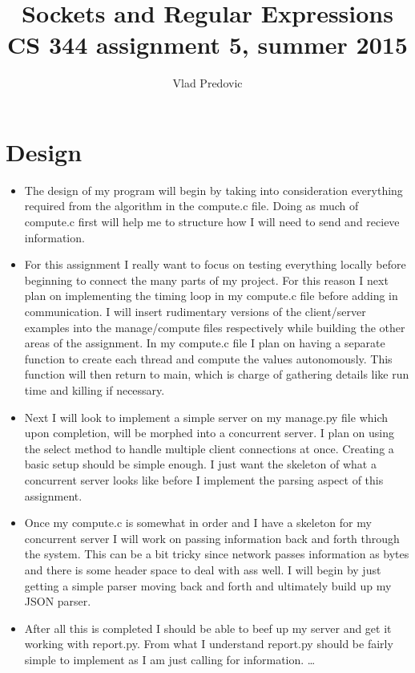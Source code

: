 \documentclass[letterpaper,10pt,titlepage]{article}
\begin{document}
\title{Sockets and Regular Expressions \\ CS 344 assignment 5, summer 2015}
\author{Vlad Predovic}
\maketitle
\section{Design}

\begin{itemize} 
\item The design of my program will begin by taking into consideration everything required from the algorithm in the compute.c file. 
Doing as much of compute.c first will help me to structure how I will need to send and recieve information.

\item For this assignment I really want to focus on testing everything locally before beginning to connect the many parts
of my project. For this reason I next plan on implementing the timing loop in my compute.c file before adding in communication.
I will insert rudimentary versions of the client/server examples into the manage/compute files respectively while building the other areas of the
assignment. In my compute.c file I plan on having a separate function to create each thread and compute the values autonomously. 
This function will then return to main, which is charge of gathering details like run time and killing if necessary.

\item Next I will look to implement a simple server on my manage.py file which upon completion, will be morphed
into a concurrent server. I plan on using the select method to handle multiple client connections at once. Creating a basic setup
should be simple enough. I just want the skeleton of what a concurrent server looks like before I implement the parsing aspect
of this assignment.

\item Once my compute.c is somewhat in order and I have a skeleton for my concurrent server I will work on passing information
back and forth through the system. This can be a bit tricky since network passes information as bytes and there is some header
space to deal with ass well. I will begin by just getting a simple parser moving back and forth and ultimately build up my JSON
parser.

\item After all this is completed I should be able to beef up my server and get it working with report.py. From what I understand
report.py should be fairly simple to implement as I am just calling for information.
\ldots 
\end{itemize}
\end{document}
